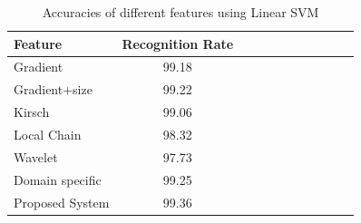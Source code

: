\documentclass[conference]{IEEEtran}
\begin{document}









%
%
\begin{table}
	\centering
		\caption{Accuracies of different features using  Linear SVM}
	\label{tab:AccuraciesOfClassifierFeaturesPairsOnMADBase}
		\begin{tabular}{|l|c|c|c|c|c|c|c|c|c|c|}
		 \hline
  Feature	& Recognition Rate \\ \hline
  Gradient & 99.18\\ \hline
Gradient+size&	 99.22	\\ \hline

	Kirsch &	99.06 \\ \hline
		Local Chain	& 98.32\\ \hline
Wavelet	&97.73 \\ \hline
Domain specific & 99.25\\ \hline
Proposed System & 99.36 \\ \hline

		\end{tabular}
\end{table}
\end{document}
